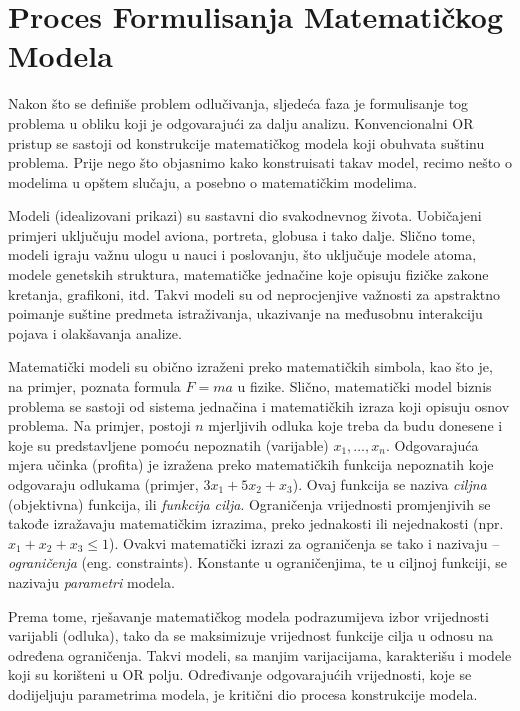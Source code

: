\documentclass[a4paper, utf8, 11pt, colorlinks]{book}
\begin{document}
\section{Proces Formulisanja Matematičkog Modela}

Nakon što se definiše problem odlučivanja, sljedeća faza je formulisanje tog problema u obliku koji je odgovarajući za dalju analizu. Konvencionalni OR pristup se sastoji od konstrukcije matematičkog modela koji obuhvata suštinu problema. Prije nego što objasnimo kako konstruisati takav model, recimo nešto o modelima u opštem slučaju, a posebno o matematičkim modelima.

Modeli (idealizovani prikazi) su sastavni dio svakodnevnog života. Uobičajeni 
primjeri uključuju model aviona, portreta, globusa i tako dalje. Slično tome, modeli igraju
važnu ulogu u nauci i poslovanju, što uključuje modele atoma, modele 
genetskih struktura, matematičke jednačine koje opisuju fizičke zakone kretanja, grafikoni, itd. Takvi modeli
su od neprocjenjive važnosti za apstraktno poimanje suštine predmeta istraživanja, ukazivanje na međusobnu interakciju pojava i olakšavanja analize. 

Matematički modeli su obično izraženi preko matematičkih simbola, kao što je, na primjer, poznata formula $F=ma$ u fizike. Slično, matematički model biznis problema   
se sastoji od sistema jednačina i matematičkih izraza koji opisuju osnov problema. Na primjer, postoji $n$ mjerljivih odluka koje treba da budu donesene i koje su predstavljene pomoću nepoznatih (varijable) $x_1,\ldots, x_n$.  Odgovarajuća mjera učinka (profita) je izražena preko matematičkih funkcija nepoznatih koje odgovaraju  odlukama (primjer, $3x_1 + 5x_2 + x_3$). Ovaj funkcija se naziva \emph{ciljna} (objektivna) funkcija, ili \emph{funkcija cilja}. Ograničenja  vrijednosti promjenjivih se takođe izražavaju matematičkim izrazima, preko jednakosti ili nejednakosti (npr. $x_1 + x_2 + x_3 \leq 1$).  Ovakvi matematički izrazi za ograničenja se tako i nazivaju -- \emph{ograničenja} (eng. constraints). Konstante u ograničenjima, te u ciljnoj funkciji, se nazivaju \emph{parametri} modela.

Prema tome, rješavanje matematičkog modela 
podrazumijeva izbor vrijednosti varijabli (odluka), tako da se maksimizuje vrijednost funkcije cilja u odnosu na određena ograničenja. Takvi modeli, sa manjim varijacijama, karakterišu i modele koji su korišteni u OR polju. 
Određivanje odgovarajućih vrijednosti, koje se dodijeljuju parametrima modela, je kritični dio procesa konstrukcije modela.
\end{document}
